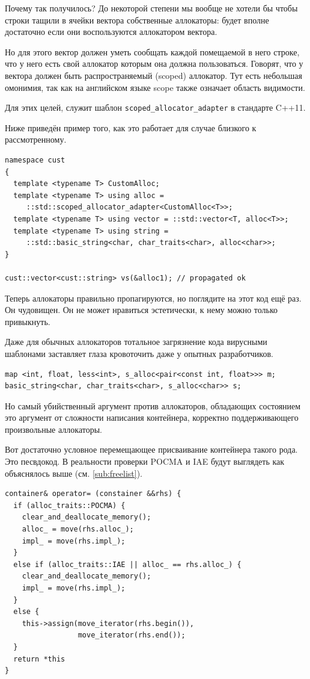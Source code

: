 \documentclass[a4paper,12pt,oneside]{book}
\begin{document}
Почему так получилось? До некоторой степени мы вообще не хотели бы чтобы строки тащили в ячейки вектора собственные аллокаторы: будет вполне достаточно если они воспользуются аллокатором вектора.

Но для этого вектор должен уметь сообщать каждой помещаемой в него строке, что у него есть свой аллокатор которым она должна пользоваться. Говорят, что у вектора должен быть распространяемый (scoped) аллокатор. Тут есть небольшая омонимия, так как на английском языке scope также означает область видимости.

Для этих целей, служит шаблон \lstinline!scoped_allocator_adapter! в стандарте C++11.

Ниже приведён пример того, как это работает для случае близкого к рассмотренному.

\begin{lstlisting}
namespace cust 
{
  template <typename T> CustomAlloc;
  template <typename T> using alloc =
     ::std::scoped_allocator_adapter<CustomAlloc<T>>;
  template <typename T> using vector = ::std::vector<T, alloc<T>>;
  template <typename T> using string = 
     ::std::basic_string<char, char_traits<char>, alloc<char>>;
}

cust::vector<cust::string> vs(&alloc1); // propagated ok
\end{lstlisting}

Теперь аллокаторы правильно пропагируются, но поглядите на этот код ещё раз. Он чудовищен. Он не может нравиться эстетически, к нему можно только привыкнуть.

Даже для обычных аллокаторов тотальное загрязнение кода вирусными шаблонами заставляет глаза кровоточить даже у опытных разработчиков.

\begin{lstlisting}
map <int, float, less<int>, s_alloc<pair<const int, float>>> m;
basic_string<char, char_traits<char>, s_alloc<char>> s;
\end{lstlisting}

Но самый убийственный аргумент против аллокаторов, обладающих состоянием это аргумент от сложности написания контейнера, корректно поддерживающего произвольные аллокаторы.

Вот достаточно условное перемещающее присваивание контейнера такого рода. Это песвдокод. В реальности проверки POCMA и IAE будут выглядеть как объяснялось выше (см. \ref{sub:freelist}).

\begin{lstlisting}
container& operator= (constainer &&rhs) {
  if (alloc_traits::POCMA) {
    clear_and_deallocate_memory();
    alloc_ = move(rhs.alloc_);
    impl_ = move(rhs.impl_);
  }
  else if (alloc_traits::IAE || alloc_ == rhs.alloc_) {
    clear_and_deallocate_memory();
    impl_ = move(rhs.impl_);
  }
  else {
    this->assign(move_iterator(rhs.begin()), 
                 move_iterator(rhs.end());
  }
  return *this
}
\end{lstlisting}
\end{document}
